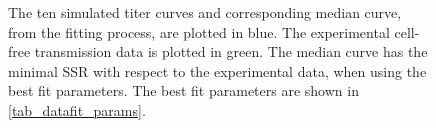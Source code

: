 \begin{figure}
\centering
    \parbox{\textwidth}{

    \vspace{0.5em}
    }
\caption{The ten simulated titer curves and corresponding median curve, from the fitting process, are plotted in blue. The experimental cell-free transmission data \citep{pinilla12} is plotted in green. The median curve has the minimal SSR with respect to the experimental data, when using the best fit parameters. The best fit parameters are shown in \ref{tab_datafit_params}. \label{fig_DataFit}}
\end{figure}

